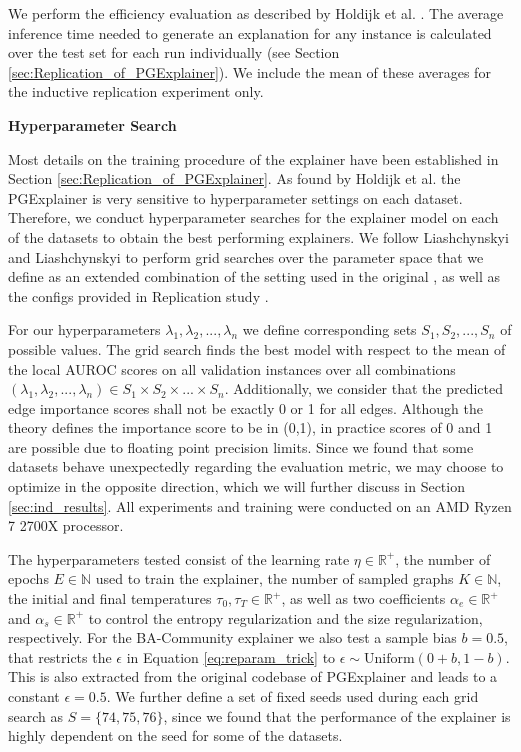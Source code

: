 We perform the efficiency evaluation as described by Holdijk et al. \cite{holdijk2021re}. The average inference time needed to generate an explanation for any instance is calculated over the test set for each run individually (see Section \ref{sec:Replication_of_PGExplainer}). We include the mean of these averages for the inductive replication experiment only. \bigskip

\textbf{Hyperparameter Search}\par
Most details on the training procedure of the explainer have been established in Section \ref{sec:Replication_of_PGExplainer}. As found by Holdijk et al. \cite{holdijk2021re} the PGExplainer is very sensitive to hyperparameter settings on each dataset. Therefore, we conduct hyperparameter searches for the explainer model on each of the datasets to obtain the best performing explainers. We follow Liashchynskyi and Liashchynskyi \cite{liashchynskyi2019grid} to perform grid searches over the parameter space that we define as an extended combination of the setting used in the original \cite{luo2020parameterized}, as well as the configs provided in Replication study \cite{holdijk2021re}. 

For our hyperparameters $\lambda_1,\lambda_2,...,\lambda_n$ we define corresponding sets $S_1,S_2,...,S_n$ of possible values. The grid search finds the best model with respect to the mean of the local AUROC scores on all validation instances over all combinations $(\lambda_1,\lambda_2,...,\lambda_n) \in S_1\times S_2 \times...\times S_n$. Additionally, we consider that the predicted edge importance scores shall not be exactly 0 or 1 for all edges. Although the theory defines the importance score to be in (0,1), in practice scores of 0 and 1 are possible due to floating point precision limits. Since we found that some datasets behave unexpectedly regarding the evaluation metric, we may choose to optimize in the opposite direction, which we will further discuss in Section \ref{sec:ind_results}. All experiments and training were conducted on an AMD Ryzen 7 2700X processor. \bigskip

The hyperparameters tested consist of the learning rate $\eta \in \mathbb{R}^+$, the number of epochs $E \in \mathbb{N}$ used to train the explainer, the number of sampled graphs $K \in \mathbb{N}$, the initial and final temperatures $\tau_0, \tau_T \in \mathbb{R}^+$, as well as two coefficients $\alpha_e\in \mathbb{R}^+$ and $\alpha_s\in \mathbb{R}^+$ to control the entropy regularization and the size regularization, respectively. For the BA-Community explainer we also test a sample bias $b=0.5$, that restricts the $\epsilon$ in Equation \ref{eq:reparam_trick} to $\epsilon \sim \text{Uniform}(0+b,1-b)$. This is also extracted from the original codebase of PGExplainer \cite{luo2020parameterized} and leads to a constant $\epsilon=0.5$. We further define a set of fixed seeds used during each grid search as $S=\{74,75,76\}$, since we found that the performance of the explainer is highly dependent on the seed for some of the datasets. \bigskip

